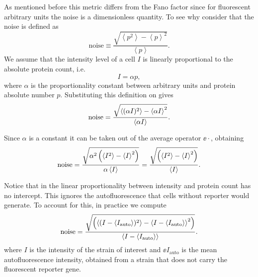 As mentioned before this metric differs from the Fano factor since for
fluorescent arbitrary units the noise is a dimensionless quantity. To see why
consider that the noise is defined as
\begin{equation}
\text{noise} \equiv \frac{\sqrt{\left\langle p^2 \right\rangle -
                        \left\langle p \right\rangle^2}}
                        {\left\langle p \right\rangle}.
    \label{seq_noise_protein}
\end{equation}
We assume that the intensity level of a cell $I$ is linearly proportional to
the absolute protein count, i.e.
\begin{equation}
I = \alpha p,
\label{seq_calibration_factor}
\end{equation}
where $\alpha$ is the proportionality constant between arbitrary units and
protein absolute number $p$. Substituting this definition on
 gives
\begin{equation}
  \text{noise} = {\sqrt{\left\langle (\alpha I)^2 \right\rangle - \left\langle \alpha I \right\rangle^2} \over
                \left\langle \alpha I \right\rangle}.
\end{equation}

Since $\alpha$ is a constant it can be taken out of the average operator
$\ee{\cdot}$, obtaining
\begin{equation}
  \text{noise} = {\sqrt{\alpha^2 \left(\left\langle I^2 \right\rangle -
                \left\langle I \right\rangle^2 \right)} \over
                \alpha \left\langle I \right\rangle}
       = {\sqrt{\left(\left\langle I^2 \right\rangle - \left\langle I \right\rangle^2 \right)} \over
                \left\langle I \right\rangle}.
\end{equation}

Notice that in  the linear proportionality between
intensity and protein count has no intercept. This ignores the autofluorescence
that cells without reporter would generate. To account for this, in practice we
compute
\begin{equation}
\text{noise} = {\sqrt{\left(\left\langle (I - \left\langle I_\text{auto} \right\rangle)^2 \right\rangle -
                    \left\langle I - \left\langle I_\text{auto} \right\rangle \right\rangle^2 \right)} \over
                \left\langle I - \left\langle I_\text{auto} \right\rangle \right\rangle}.
\end{equation}
where $I$ is the intensity of the strain of interest and $\ee{I_\text{auto}}$ is
the mean autofluorescence intensity, obtained from a strain that does not carry
the fluorescent reporter gene.

